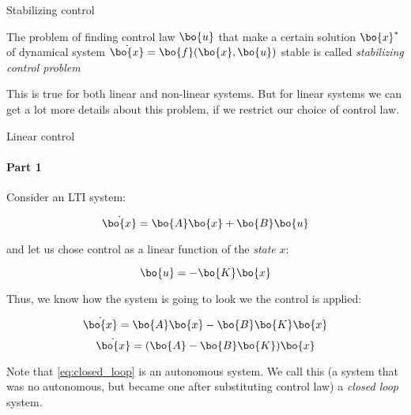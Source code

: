 \documentclass{beamer}
\begin{document}
\begin{frame}{Stabilizing control}
\begin{flushleft}

\begin{definition}
The problem of finding control law $\bo{u}$ that make a certain solution $\bo{x}^*$ of dynamical system $\dot{\bo{x}} = \bo{f}(\bo{x}, \bo{u})$ stable is called \emph{stabilizing control problem}
\end{definition}

\bigskip

This is true for both linear and non-linear systems. But for linear systems we can get a lot more details about this problem, if we restrict our choice of control law.



\end{flushleft}
\end{frame}



\begin{frame}{Linear control}
\framesubtitle{Part 1}
\begin{flushleft}

Consider an LTI system:

\begin{equation}
    \dot{\bo{x}} = \bo{A}\bo{x} + \bo{B}\bo{u}
\end{equation}

and let us chose control as a linear function of the \emph{state} $x$:

\begin{equation}
    \bo{u} = -\bo{K}\bo{x}
\end{equation}

Thus, we know how the system is going to look we the control is applied:

\begin{equation}
    \dot{\bo{x}} = \bo{A}\bo{x} - \bo{B}\bo{K}\bo{x}
\end{equation}
\begin{equation}
\label{eq:closed_loop}
    \dot{\bo{x}} = (\bo{A} - \bo{B}\bo{K})\bo{x}
\end{equation}

Note that \eqref{eq:closed_loop} is an autonomous system. We call this (a system that was no autonomous, but became one after substituting control law) a \emph{closed loop} system.

\end{flushleft}
\end{frame}
\end{document}
